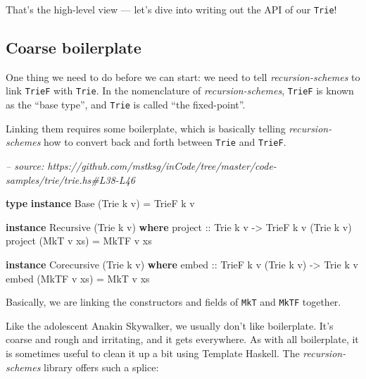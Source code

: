 \documentclass[]{article}
\newenvironment{Shaded}{}{}
\newcommand{\CommentTok}[1]{\textcolor[rgb]{0.38,0.63,0.69}{\textit{#1}}}
\newcommand{\DataTypeTok}[1]{\textcolor[rgb]{0.56,0.13,0.00}{#1}}
\newcommand{\FunctionTok}[1]{\textcolor[rgb]{0.02,0.16,0.49}{#1}}
\newcommand{\KeywordTok}[1]{\textcolor[rgb]{0.00,0.44,0.13}{\textbf{#1}}}
\newcommand{\NormalTok}[1]{#1}
\newcommand{\OtherTok}[1]{\textcolor[rgb]{0.00,0.44,0.13}{#1}}
\begin{document}
That's the high-level view --- let's dive into writing out the API of our
\texttt{Trie}!

\hypertarget{coarse-boilerplate}{%
\subsection{Coarse boilerplate}\label{coarse-boilerplate}}

One thing we need to do before we can start: we need to tell
\emph{recursion-schemes} to link \texttt{TrieF} with \texttt{Trie}. In the
nomenclature of \emph{recursion-schemes}, \texttt{TrieF} is known as the ``base
type'', and \texttt{Trie} is called ``the fixed-point''.

Linking them requires some boilerplate, which is basically telling
\emph{recursion-schemes} how to convert back and forth between \texttt{Trie} and
\texttt{TrieF}.

\begin{Shaded}
\begin{Highlighting}[]
\CommentTok{-- source: https://github.com/mstksg/inCode/tree/master/code-samples/trie/trie.hs#L38-L46}

\KeywordTok{type} \KeywordTok{instance} \DataTypeTok{Base}\NormalTok{ (}\DataTypeTok{Trie}\NormalTok{ k v) }\FunctionTok{=} \DataTypeTok{TrieF}\NormalTok{ k v}

\KeywordTok{instance} \DataTypeTok{Recursive}\NormalTok{ (}\DataTypeTok{Trie}\NormalTok{ k v) }\KeywordTok{where}
\OtherTok{    project ::} \DataTypeTok{Trie}\NormalTok{ k v }\OtherTok{->} \DataTypeTok{TrieF}\NormalTok{ k v (}\DataTypeTok{Trie}\NormalTok{ k v)}
\NormalTok{    project (}\DataTypeTok{MkT}\NormalTok{ v xs) }\FunctionTok{=} \DataTypeTok{MkTF}\NormalTok{ v xs}

\KeywordTok{instance} \DataTypeTok{Corecursive}\NormalTok{ (}\DataTypeTok{Trie}\NormalTok{ k v) }\KeywordTok{where}
\OtherTok{    embed ::} \DataTypeTok{TrieF}\NormalTok{ k v (}\DataTypeTok{Trie}\NormalTok{ k v) }\OtherTok{->} \DataTypeTok{Trie}\NormalTok{ k v}
\NormalTok{    embed (}\DataTypeTok{MkTF}\NormalTok{ v xs) }\FunctionTok{=} \DataTypeTok{MkT}\NormalTok{ v xs}
\end{Highlighting}
\end{Shaded}

Basically, we are linking the constructors and fields of \texttt{MkT} and
\texttt{MkTF} together.

Like the adolescent Anakin Skywalker, we usually don't like boilerplate. It's
coarse and rough and irritating, and it gets everywhere. As with all
boilerplate, it is sometimes useful to clean it up a bit using Template Haskell.
The \emph{recursion-schemes} library offers such a splice:
\end{document}
